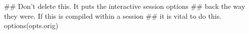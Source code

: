 \begin{Schunk}
\begin{Sinput}
 ## Don't delete this. It puts the interactive session options
 ## back the way they were. If this is compiled within a session
 ## it is vital to do this.
 options(opts.orig)
\end{Sinput}
\end{Schunk}
